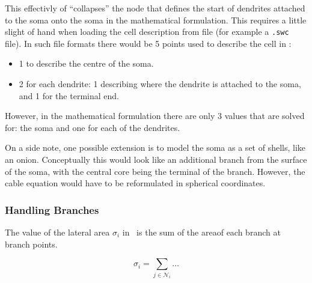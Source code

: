 This effectivly of ``collapses'' the node that defines the start of dendrites attached to the soma onto the soma in the mathematical formulation.
This requires a little slight of hand when loading the cell description from file (for example a \verb!.swc! file).
In such file formats there would be 5 points used to describe the cell in :
\begin{itemize}
    \item 1 to describe the centre of the soma.
    \item 2 for each dendrite: 1 describing where the dendrite is attached to the soma, and 1 for the terminal end.
\end{itemize}
However, in the mathematical formulation there are only 3 values that are solved for: the soma and one for each of the dendrites.

On a side note, one possible extension is to model the soma as a set of shells, like an onion.
Conceptually this would look like an additional branch from the surface of the soma, with the central core being the terminal of the branch.
However, the cable equation would have to be reformulated in spherical coordinates.


\subsubsection{Handling Branches}
The value of the lateral area $\sigma_i$ in~ is the sum of the areaof each branch at branch points.



\begin{equation}
    \sigma_i = \sum_{j\in\mathcal{N}_i} {\dots}
\end{equation}

